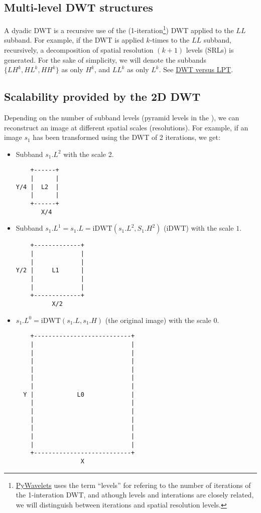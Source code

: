 \subsection{Multi-level DWT structures}
A dyadic DWT is a recursive use of the
(1-iteration\footnote{\href{https://pywavelets.readthedocs.io/en/latest/index.html}{PyWavelets}
  uses the term ``levels'' for refering to the number of iterations of
  the 1-interation DWT, and athough levels and interations are closely
  related, we will distinguish between iterations and spatial
  resolution levels.}) DWT applied to the $LL$ subband. For example,
if the DWT is applied $k$-times to the $LL$ subband, recursively, a
decomposition of spatial resolution $(k+1)$ levels (SRLs) is generated. For
the sake of simplicity, we will denote the subbands $\{LH^k, HL^k,
HH^k\}$ as only $H^k$, and $LL^k$ as only $L^k$. See
\href{https://nbviewer.jupyter.org/github/Sistemas-Multimedia/MCDWT/blob/master/docs/DWT_vs_LPT.ipynb}{DWT
  versus LPT}.

\subsection{Scalability provided by the 2D DWT}
Depending on the number of subband levels (pyramid levels in the
), we can
reconstruct an image at different spatial scales (resolutions). For
example, if an image $s_1$ has been transformed using the DWT of 2
iterations, we get:
\begin{itemize}
\item Subband $s_1.L^2$ with the scale 2.
\begin{verbatim}
    +------+
    |      |
Y/4 |  L2  |
    |      |
    +------+
       X/4
\end{verbatim}
\item Subband $s_1.L^1=s_1.L=\text{iDWT}(s_1.L^2, S_1.H^2)$
  ($\text{iDWT}$) with the scale $1$.
\begin{verbatim}
    +-------------+
    |             |
    |             |
Y/2 |     L1      |
    |             | 
    |             |
    +-------------+
          X/2
\end{verbatim}
  
\item $s_1.L^0=\text{iDWT}(s_1.L, s_1.H)$ (the original image) with
  the scale $0$.
\begin{verbatim}
    +---------------------------+
    |                           |
    |                           |
    |                           | 
    |                           |
    |                           |
    |                           |
  Y |            L0             |
    |                           | 
    |                           |
    |                           | 
    |                           | 
    |                           |
    |                           |
    +---------------------------+
                  X
\end{verbatim}
\end{itemize}

